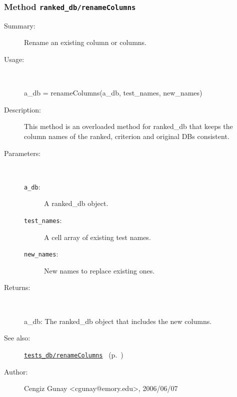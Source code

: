 \subsubsection[Method \texttt{renameColumns}]{Method \texttt{ranked\_db/renameColumns}}%
%
\label{ref_ranked_db__renameColumns}%
\hypertarget{ref_ranked_db__renameColumns}{}%
\begin{description}
\item[Summary:]Rename an existing column or columns.
%
\item[Usage:]~%
\begin{lyxcode}%
a\_db = renameColumns(a\_db, test\_names, new\_names)
%
\end{lyxcode}%
%
\item[Description:]%
This method is an overloaded method for ranked\_db that keeps the column names
 of the ranked, criterion and original DBs consistent.
\item[Parameters:]~
\begin{description}%
\item[\texttt{a\_db}:]
 A ranked\_db object.
\item[\texttt{test\_names}:]
 A cell array of existing test names.
\item[\texttt{new\_names}:]
 New names to replace existing ones.
\end{description}%
%
\item[Returns:]~

	a\_db: The ranked\_db object that includes the new columns.
%
%
\item[See also:]%
\hyperlink{ref_tests_db__renameColumns}{\texttt{tests\_db/renameColumns}}%
\ (p.~\pageref{ref_tests_db__renameColumns})%
%
%
\item[Author:]%
Cengiz Gunay <cgunay@emory.edu>, 2006/06/07%
\end{description}
\methodline%
